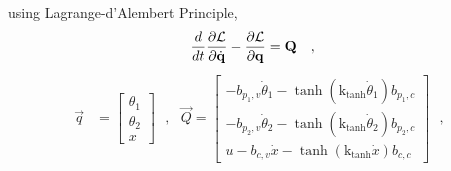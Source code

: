 using Lagrange-d’Alembert Principle, \cite{RWisniewski}
\begin{align}
  \frac{d}{dt}  \frac{\partial \cal{L}}{\partial \dot{\vec{q}}} - \frac{\partial \cal{L}}{\partial \vec{q}}  &=  \vec{Q} \ \ \ ,
  \label{eq:energyMethodWithExternalForcesTwin}
\end{align}
\begin{align}
  \vec{q} &= 
  \begin{bmatrix}
    \theta_1    \\
    \theta_2    \\
    x
  \end{bmatrix} \ \ \ , \ \ \ 
  \vec{Q} =
  \begin{bmatrix}
    -b_{p_1,v} \dot{\theta}_1 - \tanh(\text{k}_\text{tanh}\dot{\theta}_1) b_{p_1,c}    \\
    -b_{p_2,v} \dot{\theta}_2 - \tanh(\text{k}_\text{tanh}\dot{\theta}_2) b_{p_2,c}    \\
    u - b_{c,v} \dot{x} - \tanh(\text{k}_\text{tanh}\dot{x}) b_{c,c}
  \end{bmatrix} \ \ \ ,
  \label{eq:qAndQ_twin}
\end{align}

